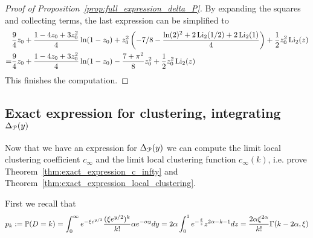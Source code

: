 \begin{proof}[Proof of Proposition~\ref{prop:full_expression_delta_P}]
By expanding the squares and collecting terms, the last expression can be simplified to
\begin{align*}
&\frac{9}{4} z_0 + \frac{1 - 4 z_0 + 3 z_0^2}{4}\ln(1 - z_0) + 
z_0^2 \left(-7/8 - \frac{\ln(2)^2+2\operatorname{Li}_2(1/2) + 2\operatorname{Li}_2(1)}{4} \right) + 
\frac{1}{2}z_0^2 \operatorname{Li}_2(z) \\
=&\frac{9}{4} z_0 + \frac{1 - 4 z_0 + 3 z_0^2}{4}\ln(1 - z_0) - \frac{7+\pi^2}{8}
z_0^2  + 
\frac{1}{2}z_0^2 \operatorname{Li}_2(z)
\end{align*}
This finishes the computation.

\end{proof}

\subsection{Exact expression for clustering, integrating $\Delta_{{\mathcal P}}(y)$}



Now that we have an expression for $\Delta_{{\mathcal P}}(y)$ we can compute the limit local clustering coefficient $c_\infty$ and the limit local clustering function $c_\infty(k)$, i.e. prove Theorem~\ref{thm:exact_expression_c_infty} and Theorem~\ref{thm:exact_expression_local_clustering}.


First we recall that
\begin{align*}
p_k := \mathbb{P}( D=k ) = \int_0^\infty e^{-\xi e^{y/2}} \frac{(\xi e^{y/2})^k}{k!}\alpha e^{-\alpha y} dy = 2\alpha \int_0^1 e^{-\frac{\xi}{z}} z^{2\alpha -k-1} dz =\frac{2\alpha \xi^{2\alpha}}{k!} \Gamma(k-2\alpha,\xi)
\end{align*}

